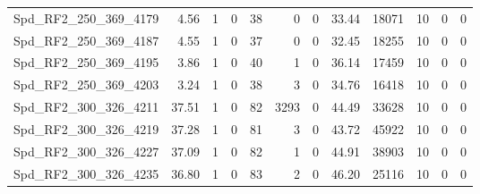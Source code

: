 \begin{longtable}[c]{@{}lrrrrrrrrrrr@{}}
Spd\_RF2\_250\_369\_4179     & 4.56                   & 1                       & 0                       & 38                     & 0                       & 0                       & 33.44                   & 18071                    & 10                       & 0                        & 0                        \\
Spd\_RF2\_250\_369\_4187     & 4.55                   & 1                       & 0                       & 37                     & 0                       & 0                       & 32.45                   & 18255                    & 10                       & 0                        & 0                        \\
Spd\_RF2\_250\_369\_4195     & 3.86                   & 1                       & 0                       & 40                     & 1                       & 0                       & 36.14                   & 17459                    & 10                       & 0                        & 0                        \\
Spd\_RF2\_250\_369\_4203     & 3.24                   & 1                       & 0                       & 38                     & 3                       & 0                       & 34.76                   & 16418                    & 10                       & 0                        & 0                        \\
Spd\_RF2\_300\_326\_4211     & 37.51                  & 1                       & 0                       & 82                     & 3293                    & 0                       & 44.49                   & 33628                    & 10                       & 0                        & 0                        \\
Spd\_RF2\_300\_326\_4219     & 37.28                  & 1                       & 0                       & 81                     & 3                       & 0                       & 43.72                   & 45922                    & 10                       & 0                        & 0                        \\
Spd\_RF2\_300\_326\_4227     & 37.09                  & 1                       & 0                       & 82                     & 1                       & 0                       & 44.91                   & 38903                    & 10                       & 0                        & 0                        \\
Spd\_RF2\_300\_326\_4235     & 36.80                  & 1                       & 0                       & 83                     & 2                       & 0                       & 46.20                   & 25116                    & 10                       & 0                        & 0                        \\

\end{longtable}
